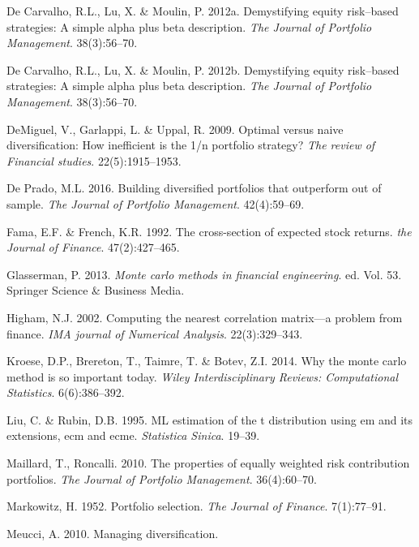 \documentclass[11pt,preprint, authoryear]{elsarticle}
\numberwithin{equation}{section}
\numberwithin{figure}{section}
\numberwithin{table}{section}
\begin{document}
\leavevmode\hypertarget{ref-leote}{}%
De Carvalho, R.L., Lu, X. \& Moulin, P. 2012a. Demystifying equity
risk--based strategies: A simple alpha plus beta description. \emph{The
Journal of Portfolio Management}. 38(3):56--70.

\leavevmode\hypertarget{ref-rawl2012}{}%
De Carvalho, R.L., Lu, X. \& Moulin, P. 2012b. Demystifying equity
risk--based strategies: A simple alpha plus beta description. \emph{The
Journal of Portfolio Management}. 38(3):56--70.

\leavevmode\hypertarget{ref-demiguel2009}{}%
DeMiguel, V., Garlappi, L. \& Uppal, R. 2009. Optimal versus naive
diversification: How inefficient is the 1/n portfolio strategy?
\emph{The review of Financial studies}. 22(5):1915--1953.

\leavevmode\hypertarget{ref-lopez}{}%
De Prado, M.L. 2016. Building diversified portfolios that outperform out
of sample. \emph{The Journal of Portfolio Management}. 42(4):59--69.

\leavevmode\hypertarget{ref-fama1992}{}%
Fama, E.F. \& French, K.R. 1992. The cross-section of expected stock
returns. \emph{the Journal of Finance}. 47(2):427--465.

\leavevmode\hypertarget{ref-glasserman2013}{}%
Glasserman, P. 2013. \emph{Monte carlo methods in financial
engineering}. ed. Vol. 53. Springer Science \& Business Media.

\leavevmode\hypertarget{ref-higham2002}{}%
Higham, N.J. 2002. Computing the nearest correlation matrix---a problem
from finance. \emph{IMA journal of Numerical Analysis}. 22(3):329--343.

\leavevmode\hypertarget{ref-kroese2014}{}%
Kroese, D.P., Brereton, T., Taimre, T. \& Botev, Z.I. 2014. Why the
monte carlo method is so important today. \emph{Wiley Interdisciplinary
Reviews: Computational Statistics}. 6(6):386--392.

\leavevmode\hypertarget{ref-liu1995}{}%
Liu, C. \& Rubin, D.B. 1995. ML estimation of the t distribution using
em and its extensions, ecm and ecme. \emph{Statistica Sinica}. 19--39.

\leavevmode\hypertarget{ref-maillard2010}{}%
Maillard, T., Roncalli. 2010. The properties of equally weighted risk
contribution portfolios. \emph{The Journal of Portfolio Management}.
36(4):60--70.

\leavevmode\hypertarget{ref-markowitz}{}%
Markowitz, H. 1952. Portfolio selection. \emph{The Journal of Finance}.
7(1):77--91.

\leavevmode\hypertarget{ref-meucci2010}{}%
Meucci, A. 2010. Managing diversification.
\end{document}
